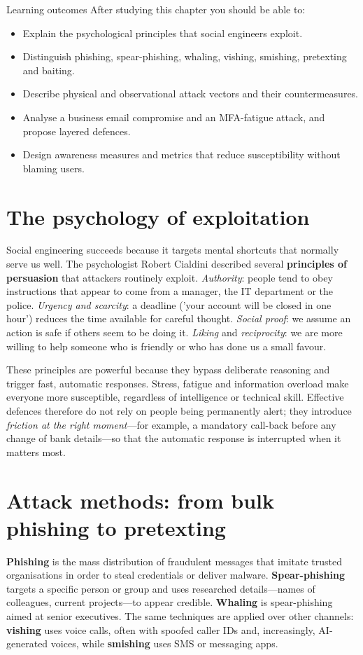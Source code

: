 \documentclass[11pt,openany]{book}
\begin{document}
\begin{outcomesbox}{Learning outcomes}
After studying this chapter you should be able to:
\begin{itemize}
  \item Explain the psychological principles that social engineers exploit.
  \item Distinguish phishing, spear-phishing, whaling, vishing, smishing, pretexting and baiting.
  \item Describe physical and observational attack vectors and their countermeasures.
  \item Analyse a business email compromise and an MFA-fatigue attack, and propose layered defences.
  \item Design awareness measures and metrics that reduce susceptibility without blaming users.
\end{itemize}
\end{outcomesbox}

\section{The psychology of exploitation}\label{sec:5.1}
Social engineering succeeds because it targets mental shortcuts that normally serve us well. The psychologist Robert Cialdini described several \textbf{principles of persuasion} that attackers routinely exploit. \emph{Authority}: people tend to obey instructions that appear to come from a manager, the IT department or the police. \emph{Urgency and scarcity}: a deadline ('your account will be closed in one hour') reduces the time available for careful thought. \emph{Social proof}: we assume an action is safe if others seem to be doing it. \emph{Liking} and \emph{reciprocity}: we are more willing to help someone who is friendly or who has done us a small favour.

These principles are powerful because they bypass deliberate reasoning and trigger fast, automatic responses. Stress, fatigue and information overload make everyone more susceptible, regardless of intelligence or technical skill. Effective defences therefore do not rely on people being permanently alert; they introduce \emph{friction at the right moment}—for example, a mandatory call-back before any change of bank details—so that the automatic response is interrupted when it matters most.

\section{Attack methods: from bulk phishing to pretexting}\label{sec:5.2}
\textbf{Phishing} is the mass distribution of fraudulent messages that imitate trusted organisations in order to steal credentials or deliver malware. \textbf{Spear-phishing} targets a specific person or group and uses researched details—names of colleagues, current projects—to appear credible. \textbf{Whaling} is spear-phishing aimed at senior executives. The same techniques are applied over other channels: \textbf{vishing} uses voice calls, often with spoofed caller IDs and, increasingly, AI-generated voices, while \textbf{smishing} uses SMS or messaging apps.
\end{document}
